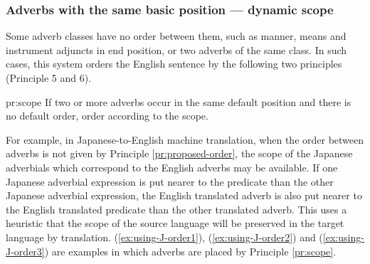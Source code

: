 \subsubsection{Adverbs with the same basic position --- dynamic scope}

Some adverb classes have no order between them, such as manner, means
and instrument adjuncts in end position, or two adverbs of the same
class.  In such cases, this system orders the English sentence by 
the following two principles (Principle 5 and 6).

\begin{pr}{pr:scope}{}
    If two or more adverbs occur in the same default position and
    there is no default order, order according to the scope.
\end{pr}

For example, in Japanese-to-English machine translation, when the
order between adverbs is not given by Principle
\ref{pr:proposed-order}, the scope of the Japanese adverbials which
correspond to the English adverbs may be available.  If one Japanese
adverbial expression is put nearer to the predicate than the other
Japanese adverbial expression, the English translated adverb is also
put nearer to the English translated predicate than the other
translated adverb.  This uses a heuristic that the scope
of the source language will be preserved in the target language by
translation. (\ref{ex:using-J-order1}), (\ref{ex:using-J-order2}) and
(\ref{ex:using-J-order3}) are examples in which adverbs are placed by
Principle \ref{pr:scope}. \vspace*{2mm} 

